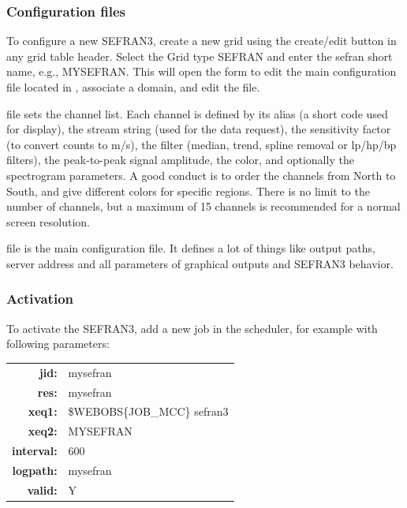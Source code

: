 \subsubsection{Configuration files}

To configure a new SEFRAN3, create a new grid using the create/edit button in any grid table header. Select the Grid type SEFRAN and enter the sefran short name, e.g., MYSEFRAN. This will open the form to edit the main configuration file located in , associate a domain, and edit the  file.


 file sets the channel list. Each channel is defined by its alias (a short code used for display), the stream string (used for the data request), the sensitivity factor (to convert counts to m/s), the filter (median, trend, spline removal or lp/hp/bp filters), the peak-to-peak signal amplitude, the color, and optionally the spectrogram parameters. A good conduct is to order the channels from North to South, and give different colors for specific regions. There is no limit to the number of channels, but a maximum of 15 channels is recommended for a normal screen resolution.

 file is the main configuration file. It defines a lot of things like output paths, server address and all parameters of graphical outputs and SEFRAN3 behavior.


\label{sefran3:channels}


\label{sefran3:conf}

\subsubsection{Activation}

To activate the SEFRAN3, add a new job in the scheduler, for example with following parameters:

\begin{tabular}{rl}
\textbf{jid:}      & mysefran \\
\textbf{res:}      & mysefran \\
\textbf{xeq1:}     & \$WEBOBS\{JOB\_MCC\} sefran3 \\
\textbf{xeq2:}     & MYSEFRAN \\
\textbf{interval:} & 600 \\
\textbf{logpath:}  & mysefran \\
\textbf{valid:}    & Y \\
\end{tabular}

